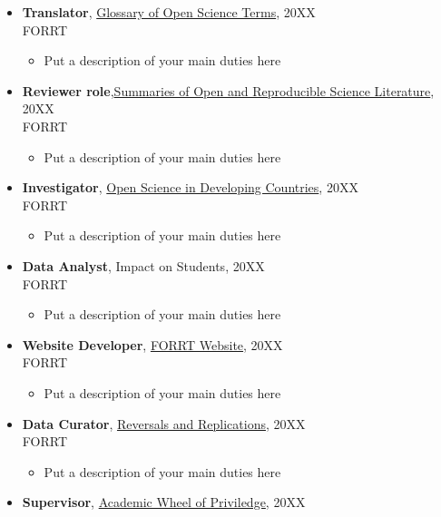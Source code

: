 \documentclass{article}
\begin{document}
\begin{itemize}[leftmargin=*]
\begin{itemize}
    \end{itemize}
 \item \textbf{Translator}, \href{https://forrt.org/glossary/}{Glossary of Open Science Terms}, 20XX\\
    FORRT
    \begin{itemize}
        \item Put a description of your main duties here
    \end{itemize}
\item \textbf{Reviewer role},\href{https://forrt.org/summaries/}{Summaries of Open and Reproducible Science Literature}, 20XX\\
    FORRT
    \begin{itemize}
        \item Put a description of your main duties here
    \end{itemize}
\item \textbf{Investigator}, \href{https://forrt.org/os-developing-world/}{Open Science in Developing Countries}, 20XX\\
    FORRT
    \begin{itemize}
        \item Put a description of your main duties here
    \end{itemize}
\item \textbf{Data Analyst}, {Impact on Students}, 20XX\\
    FORRT
    \begin{itemize}
        \item Put a description of your main duties here
    \end{itemize}
\item \textbf{Website Developer}, \href{https://forrt.org/}{FORRT Website}, 20XX\\
    FORRT
    \begin{itemize}
        \item Put a description of your main duties here
    \end{itemize}
\item \textbf{Data Curator}, \href{https://forrt.org/reversals/}{Reversals and Replications}, 20XX\\
    FORRT
    \begin{itemize}
        \item Put a description of your main duties here
    \end{itemize}
\item \textbf{Supervisor}, \href{https://forrt.org/awop/}{Academic Wheel of Priviledge}, 20XX\\

\end{itemize}
\end{document}
